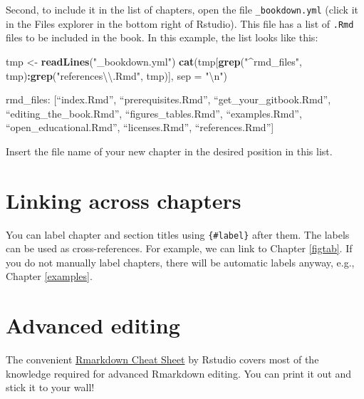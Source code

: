 \documentclass[
]{book}
\newenvironment{Shaded}{\begin{snugshade}}{\end{snugshade}}
\newcommand{\CharTok}[1]{\textcolor[rgb]{0.31,0.60,0.02}{#1}}
\newcommand{\DataTypeTok}[1]{\textcolor[rgb]{0.13,0.29,0.53}{#1}}
\newcommand{\KeywordTok}[1]{\textcolor[rgb]{0.13,0.29,0.53}{\textbf{#1}}}
\newcommand{\NormalTok}[1]{#1}
\newcommand{\OperatorTok}[1]{\textcolor[rgb]{0.81,0.36,0.00}{\textbf{#1}}}
\newcommand{\StringTok}[1]{\textcolor[rgb]{0.31,0.60,0.02}{#1}}
\begin{document}
Second, to include it in the list of chapters, open the file \texttt{\_bookdown.yml} (click it in the Files explorer in the bottom right of Rstudio). This file has a list of \texttt{.Rmd} files to be included in the book. In this example, the list looks like this:

\begin{Shaded}
\begin{Highlighting}[]
\NormalTok{tmp <-}\StringTok{ }\KeywordTok{readLines}\NormalTok{(}\StringTok{"_bookdown.yml"}\NormalTok{)}
\KeywordTok{cat}\NormalTok{(tmp[}\KeywordTok{grep}\NormalTok{(}\StringTok{"^rmd_files"}\NormalTok{, tmp)}\OperatorTok{:}\KeywordTok{grep}\NormalTok{(}\StringTok{"references}\CharTok{\textbackslash{}\textbackslash{}}\StringTok{.Rmd"}\NormalTok{, tmp)], }\DataTypeTok{sep =} \StringTok{"}\CharTok{\textbackslash{}n}\StringTok{"}\NormalTok{)}
\end{Highlighting}
\end{Shaded}

rmd\_files: {[}``index.Rmd'',
``prerequisites.Rmd'',
``get\_your\_gitbook.Rmd'',
``editing\_the\_book.Rmd'',
``figures\_tables.Rmd'',
``examples.Rmd'',
``open\_educational.Rmd'',
``licenses.Rmd'',
``references.Rmd''{]}

Insert the file name of your new chapter in the desired position in this list.

\hypertarget{linking-across-chapters}{%
\section{Linking across chapters}\label{linking-across-chapters}}

You can label chapter and section titles using \texttt{\{\#label\}} after them. The labels can be used as cross-references. For example, we can link to Chapter \ref{figtab}. If you do not manually label chapters, there will be automatic labels anyway, e.g., Chapter \ref{examples}.

\hypertarget{advanced-editing}{%
\section{Advanced editing}\label{advanced-editing}}

The convenient \href{https://rstudio.com/wp-content/uploads/2016/03/rmarkdown-cheatsheet-2.0.pdf}{Rmarkdown Cheat Sheet} by Rstudio covers most of the knowledge required for advanced Rmarkdown editing. You can print it out and stick it to your wall!
\end{document}
